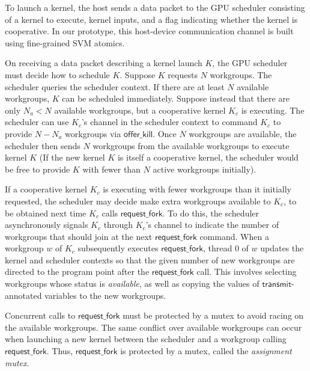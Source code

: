 \documentclass[sigconf]{acmart}
\newcommand{\KC}{\mathit{KC}}
\newcommand{\transmit}{\mathsf{transmit}}
\newcommand{\offerfork}{\mathsf{request\_fork}}
\newcommand{\offerkill}{\mathsf{offer\_kill}}
\begin{document}
{
%
To launch a kernel, the host sends a data packet to the GPU scheduler
consisting of a kernel to execute, kernel inputs, and a flag
indicating whether the kernel is cooperative. In our prototype,
this host-device communication channel is built using fine-grained SVM
atomics.

On receiving a data packet describing a kernel launch $K$, the GPU
scheduler must decide how to schedule $K$. Suppose $K$ requests $N$
workgroups. The scheduler queries the scheduler context.  If there are
at least $N$ available workgroups, $K$ can be scheduled
immediately. Suppose instead that there are only $N_a < N$ available
workgroups, but a cooperative kernel $K_c$ is executing. The scheduler
can use $K_c$'s channel in the scheduler context to command $K_c$ to
provide $N - N_a$ workgroups via $\offerkill$.  Once $N$ workgroups
are available,
the scheduler then sends $N$ workgroups from the available workgroups
to execute kernel $K$
(If the new kernel $K$ is itself a cooperative kernel, the scheduler
would be free to provide $K$ with fewer than $N$ active workgroups
initially).

If a cooperative kernel $K_c$ is executing with fewer workgroups than
it initially requested, the scheduler may decide make extra workgroups
available to $K_c$, to be obtained next time $K_c$ calls $\offerfork$.
To do this, the scheduler asynchronously signals $K_c$ through $K_c$'s
channel to indicate the number of workgroups that should join at the
next $\offerfork$ command.  When a workgroup $w$ of $K_c$ subsequently
executes $\offerfork$, thread 0 of $w$ updates the kernel and
scheduler contexts so that the given number of new workgroups are
directed to the program point after the $\offerfork$ call.  This
involves selecting workgroups whose status is \emph{available}, as
well as copying the values of $\transmit$-annotated variables to the
new workgroups.

%
Concurrent calls to $\offerfork$ must be protected by a mutex to avoid
racing on the available workgroups. The same conflict over available
workgroups can occur when launching a new kernel between the scheduler
and a workgroup calling $\offerfork$. Thus, $\offerfork$ is protected
by a mutex, called the \emph{assignment mutex}.

}
\end{document}
